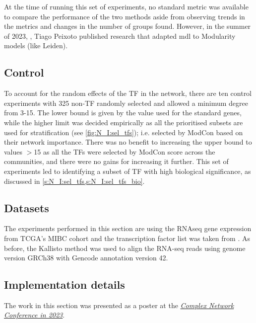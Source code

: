 At the time of running this set of experiments, no standard metric was available to compare the performance of the two methods aside from observing trends in the metrics and changes in the number of groups found. However, in the summer of 2023, \cite{Peixoto2023-mw}, Tiago Peixoto published research that adapted \acrshort{mdl} to Modularity models (like Leiden).

\subsection*{Control}

To account for the random effects of the TF in the network, there are ten control experiments with 325 non-TF randomly selected and allowed a minimum degree from 3-15. The lower bound is given by the value used for the standard genes, while the higher limit was decided empirically as all the prioritised subsets are used for stratification (see \cref{fig:N_I:sel_tfs}); i.e. selected by ModCon based on their network importance. There was no benefit to increasing the upper bound to values $>$15 as all the TFs were selected by ModCon score across the communities, and there were no gains for increasing it further. This set of experiments led to identifying a subset of TF with high biological significance, as discussed in \cref{s:N_I:sel_tfs,s:N_I:sel_tfs_bio}.

\subsection*{Datasets}

The experiments performed in this section are using the RNAseq gene expression from TCGA's MIBC cohort and the transcription factor list was taken from \citet{Lambert2018-el}. As before, the Kallisto method was used to align the RNA-seq reads using genome version GRCh38 with Gencode annotation version 42. 

\subsection*{Implementation details}

The work in this section was presented as a poster at the \textit{\href{https://2023.complexnetworks.org/}{Complex Network Conference in 2023}}.


